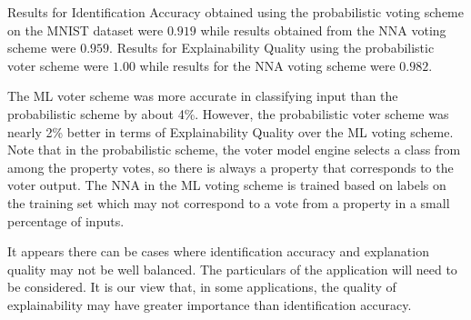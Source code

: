 \documentclass[conference]{IEEEtran}
\begin{document}
Results for Identification Accuracy obtained using the probabilistic voting scheme on the MNIST dataset were $0.919$ while results obtained from the NNA voting scheme were $0.959$.  Results for Explainability Quality using the probabilistic voter scheme were $1.00$ while results for the NNA voting scheme were $0.982$.

The ML voter scheme was more accurate in classifying input than the probabilistic scheme by about 4\%.   However, the probabilistic voter scheme was nearly 2\% better in terms of Explainability Quality over the ML voting scheme.  Note that in the probabilistic scheme, the voter model engine selects a class from among the property votes, so there is always a property that corresponds to the voter output.  The NNA in the ML voting scheme is trained based on labels on the training set which may not correspond to a vote from a property in a small percentage of inputs.

It appears there can be cases where identification accuracy and explanation quality may not be well balanced.  The particulars of the application will need to be considered.  It is our view that, in some applications, the quality of explainability may have greater importance than identification accuracy.
\end{document}
